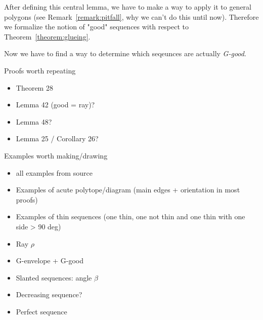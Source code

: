 After defining this central lemma, we have to make a way to apply it to general polygons (see Remark~\ref{remark:pitfall}, why we can't do this until now).
Therefore we formalize the notion of "good" sequences with respect to Theorem~\ref{theorem:glueing}.

\begin{definition}[G-envelope]
\end{definition}

\begin{definition}[G-good]
\end{definition}

Now we have to find a way to determine which seqeunces are actually \emph{G-good}.
\begin{lemma}
\end{lemma}




Proofs worth repeating
\begin{itemize}
  \item Theorem 28
  \item Lemma 42 (good = ray)?
  \item Lemma 48?
  \item Lemma 25 / Corollary 26?
\end{itemize}

Examples worth making/drawing
\begin{itemize}
  \item all examples from source
  \item Examples of acute polytope/diagram (main edges + orientation in most proofs)
  \item Examples of thin sequences (one thin, one not thin and one thin with one side > 90 deg)
  \item Ray $\rho$
  \item G-envelope + G-good
  \item Slanted sequences: angle $\beta$
  \item Decreasing sequence?
  \item Perfect sequence
\end{itemize}

